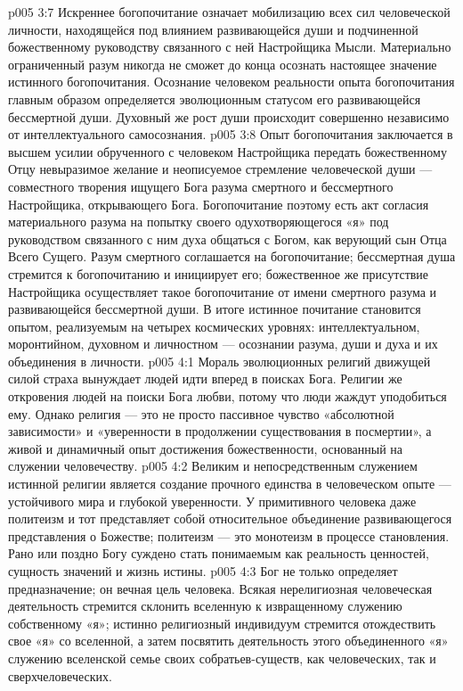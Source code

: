 \vs p005 3:7 \pc Искреннее богопочитание означает мобилизацию всех сил человеческой личности, находящейся под влиянием развивающейся души и подчиненной божественному руководству связанного с ней Настройщика Мысли. Материально ограниченный разум никогда не сможет до конца осознать настоящее значение истинного богопочитания. Осознание человеком реальности опыта богопочитания главным образом определяется эволюционным статусом его развивающейся бессмертной души. Духовный же рост души происходит совершенно независимо от интеллектуального самосознания.
\vs p005 3:8 Опыт богопочитания заключается в высшем усилии обрученного с человеком Настройщика передать божественному Отцу невыразимое желание и неописуемое стремление человеческой души --- совместного творения ищущего Бога разума смертного и бессмертного Настройщика, открывающего Бога. Богопочитание поэтому есть акт согласия материального разума на попытку своего одухотворяющегося «я» под руководством связанного с ним духа общаться с Богом, как верующий сын Отца Всего Сущего. Разум смертного соглашается на богопочитание; бессмертная душа стремится к богопочитанию и инициирует его; божественное же присутствие Настройщика осуществляет такое богопочитание от имени смертного разума и развивающейся бессмертной души. В итоге истинное почитание становится опытом, реализуемым на четырех космических уровнях: интеллектуальном, моронтийном, духовном и личностном --- осознании разума, души и духа и их объединения в личности.
\vs p005 4:1 Мораль эволюционных религий движущей силой страха вынуждает людей идти вперед в поисках Бога. Религии же откровения  людей на поиски Бога любви, потому что люди жаждут уподобиться ему. Однако религия --- это не просто пассивное чувство «абсолютной зависимости» и «уверенности в продолжении существования в посмертии», а живой и динамичный опыт достижения божественности, основанный на служении человечеству.
\vs p005 4:2 Великим и непосредственным служением истинной религии является создание прочного единства в человеческом опыте --- устойчивого мира и глубокой уверенности. У примитивного человека даже политеизм и тот представляет собой относительное объединение развивающегося представления о Божестве; политеизм --- это монотеизм в процессе становления. Рано или поздно Богу суждено стать понимаемым как реальность ценностей, сущность значений и жизнь истины.
\vs p005 4:3 Бог не только определяет предназначение; он  вечная цель человека. Всякая нерелигиозная человеческая деятельность стремится склонить вселенную к извращенному служению собственному «я»; истинно религиозный индивидуум стремится отождествить свое «я» со вселенной, а затем посвятить деятельность этого объединенного «я» служению вселенской семье своих собратьев\hyp{}существ, как человеческих, так и сверхчеловеческих.
